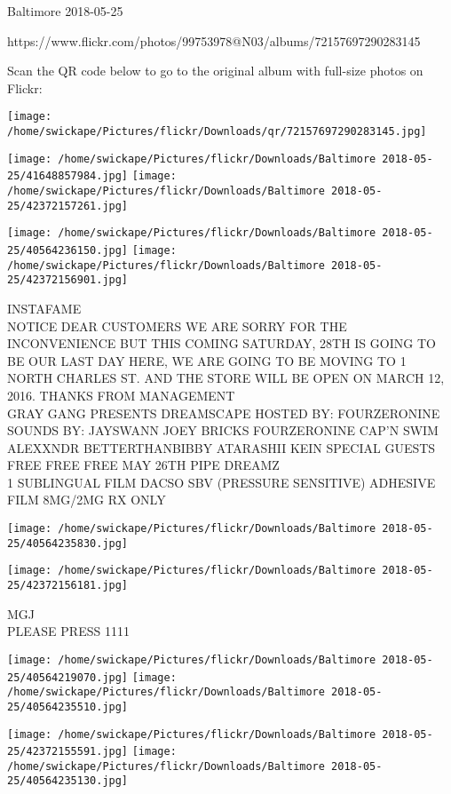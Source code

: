 \documentclass[10pt,letterpaper]{article}
\begin{document}
Baltimore 2018-05-25

https://www.flickr.com/photos/99753978@N03/albums/72157697290283145

Scan the QR code below to go to the original album with full-size photos on Flickr:

\texttt{[image: /home/swickape/Pictures/flickr/Downloads/qr/72157697290283145.jpg]}
\pagebreak

\texttt{[image: /home/swickape/Pictures/flickr/Downloads/Baltimore 2018-05-25/41648857984.jpg]}
\texttt{[image: /home/swickape/Pictures/flickr/Downloads/Baltimore 2018-05-25/42372157261.jpg]}

\texttt{[image: /home/swickape/Pictures/flickr/Downloads/Baltimore 2018-05-25/40564236150.jpg]}
\texttt{[image: /home/swickape/Pictures/flickr/Downloads/Baltimore 2018-05-25/42372156901.jpg]}

INSTAFAME\\
NOTICE DEAR CUSTOMERS WE ARE SORRY FOR THE INCONVENIENCE BUT THIS COMING SATURDAY, 28TH IS GOING TO BE OUR LAST DAY HERE, WE ARE GOING TO BE MOVING TO 1 NORTH CHARLES ST. AND THE STORE WILL BE OPEN ON MARCH 12, 2016.  THANKS FROM MANAGEMENT\\
GRAY GANG PRESENTS DREAMSCAPE HOSTED BY: FOURZERONINE SOUNDS BY: JAYSWANN JOEY BRICKS FOURZERONINE CAP'N SWIM ALEXXNDR BETTERTHANBIBBY ATARASHII KEIN SPECIAL GUESTS FREE FREE FREE MAY 26TH PIPE DREAMZ\\
1 SUBLINGUAL FILM DACSO SBV (PRESSURE SENSITIVE) ADHESIVE FILM 8MG/2MG RX ONLY\\
\pagebreak

\texttt{[image: /home/swickape/Pictures/flickr/Downloads/Baltimore 2018-05-25/40564235830.jpg]}

\vspace{0.25in}
\texttt{[image: /home/swickape/Pictures/flickr/Downloads/Baltimore 2018-05-25/42372156181.jpg]}

MGJ\\
PLEASE PRESS 1111\\
\pagebreak

\texttt{[image: /home/swickape/Pictures/flickr/Downloads/Baltimore 2018-05-25/40564219070.jpg]}
\texttt{[image: /home/swickape/Pictures/flickr/Downloads/Baltimore 2018-05-25/40564235510.jpg]}

\texttt{[image: /home/swickape/Pictures/flickr/Downloads/Baltimore 2018-05-25/42372155591.jpg]}
\texttt{[image: /home/swickape/Pictures/flickr/Downloads/Baltimore 2018-05-25/40564235130.jpg]}
\end{document}
